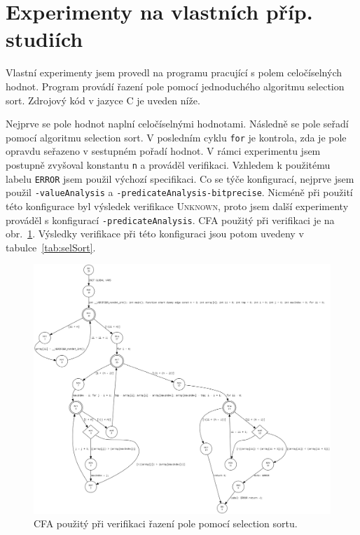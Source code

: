\documentclass[a4paper,12pt]{article}
\begin{document}
\section{Experimenty na vlastních příp. studiích}
Vlastní experimenty jsem provedl na programu pracující s polem celočíselných hodnot. Program provádí řazení pole pomocí 
jednoduchého algoritmu selection sort. Zdrojový kód v jazyce C je uveden níže.



Nejprve se pole hodnot naplní celočíselnými hodnotami. Následně se pole seřadí pomocí algoritmu
selection sort. V posledním cyklu \texttt{for} je kontrola, zda je pole opravdu seřazeno v sestupném
pořadí hodnot. V rámci experimentu jsem postupně zvyšoval konstantu \texttt{n} a prováděl verifikaci.
Vzhledem k použitému labelu \texttt{ERROR} jsem použil výchozí specifikaci. Co se týče konfigurací, 
nejprve jsem použil \texttt{-valueAnalysis} a \texttt{-predicateAnalysis-bitprecise}. Nicméně při použití této konfigurace byl výsledek verifikace
\textsc{Unknown}, proto jsem další experimenty prováděl s konfigurací \texttt{-predicateAnalysis}.
CFA použitý při verifikaci je na obr.~\ref{fig:cfasort}.
Výsledky verifikace při této konfiguraci jsou potom uvedeny v tabulce~\ref{tab:selSort}.

\begin{figure}[h!]
 \centering
 \includegraphics[scale=0.27]{Images/sortArray.png}
 \caption{CFA použitý při verifikaci řazení pole pomocí selection sortu.}
 \label{fig:cfasort}
\end{figure}
\end{document}
